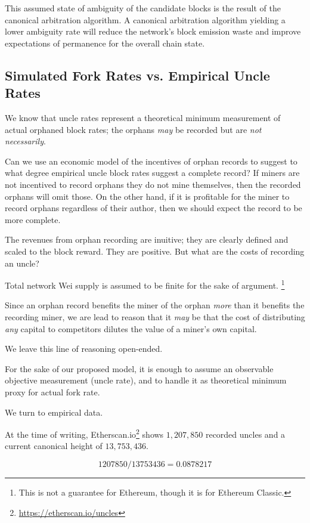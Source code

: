 \documentclass[11pt]{article}
\theoremstyle{plain}
\begin{document}
{This assumed state of ambiguity of the candidate blocks is the result of the
canonical arbitration algorithm. A canonical arbitration algorithm yielding a
lower ambiguity rate will reduce the network's block emission waste and improve
expectations of permanence for the overall chain state.

\subsection{\normalsize{Simulated Fork Rates vs. Empirical Uncle Rates}}

We know that uncle rates represent a theoretical minimum measurement of actual
orphaned block rates; the orphans \emph{may} be recorded but are \emph{not
necessarily}.

Can we use an economic model of the incentives of orphan records to suggest to
what degree empirical uncle block rates suggest a complete record?
If miners are not incentived to record orphans they do not mine themselves,
then the recorded orphans will omit those. On the other hand, if it is
profitable for the miner to record orphans regardless of their author, then we
should expect the record to be more complete.

The revenues from orphan recording are inuitive; they are clearly defined and
scaled to the block reward. They are positive. But what are the costs of
recording an uncle?

Total network Wei supply is assumed to be finite for the sake of
argument.\nolinebreak
\footnote{This is not a guarantee for Ethereum, though it is for Ethereum Classic.}

Since an orphan record benefits the miner of the orphan \emph{more} than it
benefits the recording miner, we are lead to reason that it \emph{may} be that the
cost of distributing \emph{any} capital to competitors dilutes the value of a
miner's own capital.

We leave this line of reasoning open-ended.

For the sake of our proposed model, it is enough to assume an observable
objective measurement (uncle rate), and to handle it as theoretical minimum
proxy for actual fork rate.

We turn to empirical data.

At the time of writing, Etherscan.io\footnote{\url{https://etherscan.io/uncles}}
shows $1,207,850$ recorded uncles and a current canonical height of $13,753,436$. 

\begin{equation}
  1207850 / 13753436 = 0.0878217
\end{equation}

}
\end{document}
